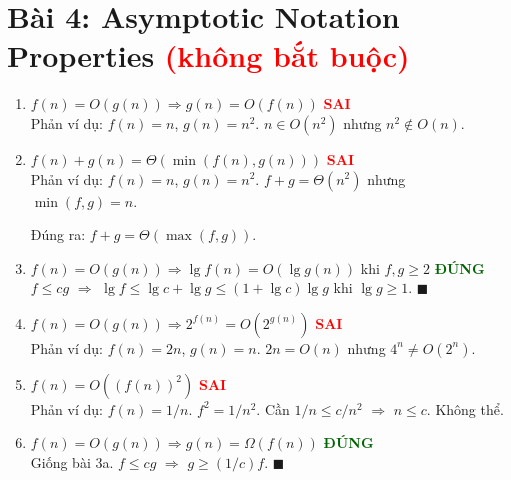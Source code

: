 \documentclass[12pt,a4paper]{article}
\begin{document}
\section{Bài 4: Asymptotic Notation Properties {\small\textcolor{red}{(không bắt buộc)}}}

\begin{enumerate}[label=\textbf{\alph*.}]

  \item $f(n) = O(g(n)) \Rightarrow g(n) = O(f(n))$ \hfill \textcolor{red}{\textbf{SAI}} \\[4pt]
  Phản ví dụ: $f(n) = n$, $g(n) = n^2$. $n \in O(n^2)$ nhưng $n^2 \notin O(n)$.

  \bigskip

  \item $f(n) + g(n) = \Theta(\min(f(n), g(n)))$ \hfill \textcolor{red}{\textbf{SAI}} \\[4pt]
  Phản ví dụ: $f(n) = n$, $g(n) = n^2$. $f+g = \Theta(n^2)$ nhưng $\min(f,g) = n$.

  Đúng ra: $f+g = \Theta(\max(f,g))$.

  \bigskip

  \item $f(n) = O(g(n)) \Rightarrow \lg f(n) = O(\lg g(n))$ khi $f,g \geq 2$ \hfill \textcolor{darkgreen}{\textbf{ĐÚNG}} \\[4pt]
  $f \leq cg$ $\Rightarrow$ $\lg f \leq \lg c + \lg g \leq (1+\lg c)\lg g$ khi $\lg g \geq 1$. \hfill $\blacksquare$

  \bigskip

  \item $f(n) = O(g(n)) \Rightarrow 2^{f(n)} = O(2^{g(n)})$ \hfill \textcolor{red}{\textbf{SAI}} \\[4pt]
  Phản ví dụ: $f(n) = 2n$, $g(n) = n$. $2n = O(n)$ nhưng $4^n \neq O(2^n)$.

  \bigskip

  \item $f(n) = O((f(n))^2)$ \hfill \textcolor{red}{\textbf{SAI}} \\[4pt]
  Phản ví dụ: $f(n) = 1/n$. $f^2 = 1/n^2$. Cần $1/n \leq c/n^2$ $\Rightarrow$ $n \leq c$. Không thể.

  \bigskip

  \item $f(n) = O(g(n)) \Rightarrow g(n) = \Omega(f(n))$ \hfill \textcolor{darkgreen}{\textbf{ĐÚNG}} \\[4pt]
  Giống bài 3a. $f \leq cg$ $\Rightarrow$ $g \geq (1/c)f$. \hfill $\blacksquare$


\end{enumerate}
\end{document}
